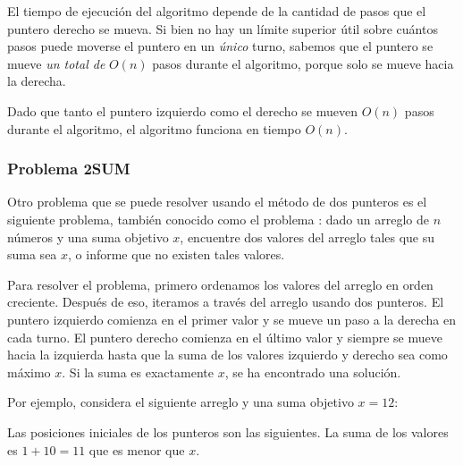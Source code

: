 El tiempo de ejecución del algoritmo depende de
la cantidad de pasos que el puntero derecho se mueva.
Si bien no hay un límite superior útil sobre cuántos pasos puede
moverse el puntero en un \emph{único} turno,
sabemos que el puntero se mueve \emph{un total de}
$O(n)$ pasos durante el algoritmo,
porque solo se mueve hacia la derecha.

Dado que tanto el puntero izquierdo como el derecho
se mueven $O(n)$ pasos durante el algoritmo,
el algoritmo funciona en tiempo $O(n)$.

\subsubsection{Problema 2SUM}

Otro problema que se puede resolver usando
el método de dos punteros es el siguiente problema,
también conocido como el problema :
dado un arreglo de $n$ números y
una suma objetivo $x$, encuentre
dos valores del arreglo tales que su suma sea $x$,
o informe que no existen tales valores.

Para resolver el problema, primero
ordenamos los valores del arreglo en orden creciente.
Después de eso, iteramos a través del arreglo usando
dos punteros.
El puntero izquierdo comienza en el primer valor
y se mueve un paso a la derecha en cada turno.
El puntero derecho comienza en el último valor
y siempre se mueve hacia la izquierda hasta que la suma de los
valores izquierdo y derecho sea como máximo $x$.
Si la suma es exactamente $x$,
se ha encontrado una solución.

\pagebreak
Por ejemplo, considera el siguiente arreglo
y una suma objetivo $x=12$:
\begin{center}
\end{center}

Las posiciones iniciales de los punteros
son las siguientes.
La suma de los valores es $1+10=11$
que es menor que $x$.

\begin{center}
\end{center}

